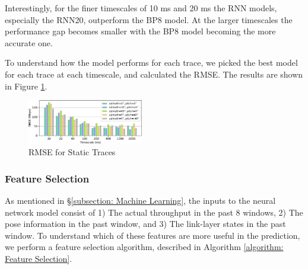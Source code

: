 \documentclass[sigconf,anonymous]{acmart}
\begin{document}
Interestingly, for the finer timescales of 10 ms and 20 ms the RNN models, especially the RNN20, outperform the BP8 model. At the larger timescales the performance gap becomes smaller with the BP8 model becoming the more accurate one.



To understand how the model performs for each trace, we picked the best model for each trace at each timescale, and calculated the RMSE. The results are shown in Figure \ref{figure: RMSE for Static Traces}.

\begin{figure}[h]
\includegraphics[width=0.45\textwidth]{figs/rmse_along_angle.pdf}
\caption{RMSE for Static Traces}
\label{figure: RMSE for Static Traces}
\end{figure}

\subsubsection{Feature Selection}
As mentioned in \S\ref{subsection: Machine Learning}, the inputs to the neural network model consist of 1) The actual throughput in the past 8 windows, 2) The pose information in the past window, and 3) The link-layer states in the past window. To understand which of these features are more useful in the prediction, we perform a feature selection algorithm, described in Algorithm \ref{algorithm: Feature Selection}.
\end{document}

